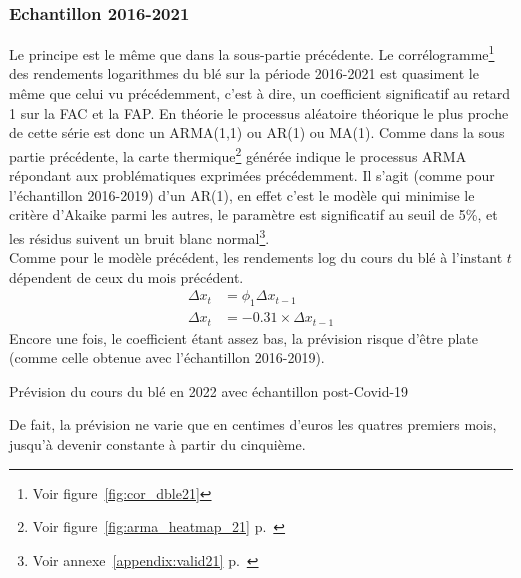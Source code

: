 \subsubsection{Echantillon 2016-2021}
Le principe est le même que dans la sous-partie précédente. Le corrélogramme\footnote{Voir figure~\ref{fig:cor_dble21}} des rendements logarithmes du blé sur la période
2016-2021 est quasiment le même que celui vu précédemment, c'est à dire, un coefficient significatif au retard 1 sur la FAC et la FAP. En théorie le processus aléatoire 
théorique le plus proche de cette série est donc un ARMA(1,1) ou AR(1) ou MA(1). Comme dans la sous partie précédente, la carte 
thermique\footnote{Voir figure~\ref{fig:arma_heatmap_21} p.~\pageref{fig:arma_heatmap_21}} générée indique le processus ARMA répondant aux problématiques exprimées 
précédemment. Il s'agit (comme pour l'échantillon 2016-2019) d'un AR(1), en effet c'est le modèle qui minimise le critère d'Akaike parmi les autres, le paramètre est
significatif au seuil de 5\%, et les résidus suivent un bruit blanc normal\footnote{Voir annexe~\ref{appendix:valid21} p.~\pageref{appendix:valid21}}.\\[11pt]
Comme pour le modèle précédent, les rendements log du cours du blé à l'instant $t$ dépendent de ceux du mois précédent.
\begin{equation*}
    \begin{split}
        \Delta x_{t} &= \phi_{1} \Delta x_{t-1} \\
        \Delta x_{t} &=-0.31 \times \Delta x_{t-1}
    \end{split}
\end{equation*}
Encore une fois, le coefficient étant assez bas, la prévision risque d'être plate (comme celle obtenue avec l'échantillon 2016-2019).
\begin{table}[H]
    \centering
    \caption{Prévision du cours du blé en 2022 avec échantillon post-Covid-19}
    \sffamily
    
\end{table}
De fait, la prévision ne varie que en centimes d'euros les quatres premiers mois, jusqu'à devenir constante à partir du cinquième.
